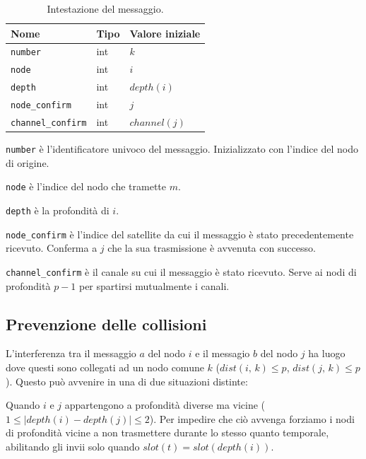 \documentclass[a4paper,12pt]{article}
\theoremstyle{definition}
\begin{document}
\begin{table}[H]
\centering
\begin{tabular}{| l | l | l |}
\multicolumn{1}{l}{Nome} &
\multicolumn{1}{l}{Tipo} &
\multicolumn{1}{l}{Valore iniziale} \\ \hline
\texttt{number} & int & $k$ \\ \hline
\texttt{node} & int & $i$ \\ \hline
\texttt{depth} & int & $depth(i)$ \\ \hline
\texttt{node\_confirm} & int & $j$ \\ \hline
\texttt{channel\_confirm} & int & $channel(j)$ \\ \hline
\end{tabular}
\caption{Intestazione del messaggio.}
\end{table}

\texttt{number} è l'identificatore univoco del messaggio. Inizializzato con l'indice del nodo di origine.

\texttt{node} è l'indice del nodo che tramette $m$.

\texttt{depth} è la profondità di $i$.

\texttt{node\_confirm} è l'indice del satellite da cui il messaggio è stato precedentemente ricevuto. Conferma a $j$ che la sua trasmissione è avvenuta con successo.

\texttt{channel\_confirm} è il canale su cui il messaggio è stato ricevuto. Serve ai nodi di profondità $p-1$ per spartirsi mutualmente i canali.

\subsection{Prevenzione delle collisioni}

L'interferenza tra il messaggio $a$ del nodo $i$ e il messagio $b$ del nodo $j$ ha luogo dove questi sono collegati ad un nodo comune $k$ ($dist(i,\,k) \leq p$, $dist(j,\,k) \leq p$). Questo può avvenire in una di due situazioni distinte:

Quando $i$ e $j$ appartengono a profondità diverse ma vicine ($1 \leq |depth(i) - depth(j)| \leq 2$). Per impedire che ciò avvenga forziamo i nodi di profondità vicine a non trasmettere durante lo stesso quanto temporale, abilitando gli invii solo quando $slot(t) = slot(depth(i))$.
\end{document}
